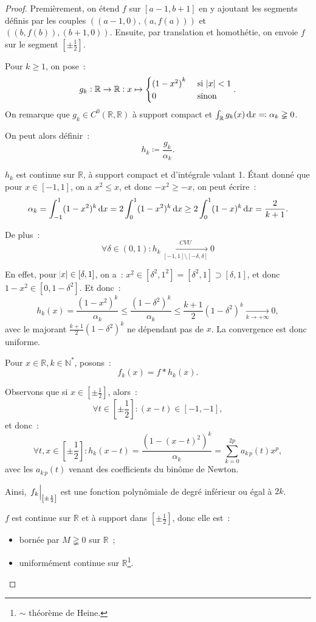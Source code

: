\documentclass{report}
\theoremstyle{definition}
\theoremstyle{remark}
\newcommand{\R}{\mathbb R}
\newcommand{\N}{\mathbb N}
\newcommand{\Ns}{\N^{*}}
\newcommand{\restr}[2]{\left.#1\vphantom{\big|}\right|_{#2}}
\newcommand{\pinfty}{{+\infty}}
\begin{document}
			\begin{proof} Premièrement, on étend $f$ sur $[a-1, b+1]$ en y ajoutant les segments définis par les couples $\left((a-1, 0), (a, f(a))\right)$ et
			$\left((b, f(b)), (b+1, 0)\right)$. Ensuite, par translation et homothétie, on envoie $f$ sur le segment $\left[\pm \frac 12\right]$.

			Pour $k \geq 1$, on pose~:
			\[g_k : \R \to \R : x \mapsto \begin{cases}{(1-x^2)}^k &\text{ si } \abs x < 1 \\0 &\text{ sinon}\end{cases}.\]
			On remarque que $g_k \in C^0(\R, \R)$ à support compact et $\int_\R g_k(x)\dif x \eqqcolon \alpha_k \gneqq 0$.

			On peut alors définir~:
			\[h_k \coloneqq \frac {g_k}{\alpha_k}.\]

			$h_k$ est continue sur $\R$, à support compact et d'intégrale valant 1. Étant donné que pour $x \in [-1, 1]$, on a $x^2 \leq x$, et donc $-x^2 \geq -x$,
			on peut écrire~:
			\[\alpha_k = \int_{-1}^1(1-x^2)^k\dif x = 2\int_0^1(1-x^2)^k\dif x \geq 2\int_0^1(1-x)^k\dif x = \frac 2{k+1}.\]

			De plus~:
			\[\forall \delta \in (0, 1) : h_k \xrightarrow[{[-1, 1] \setminus [-\delta, \delta]}]{CVU} 0\]

			En effet, pour $\abs x \in [\delta, 1]$, on a~: $x^2 \in [\delta^2, 1^2] = [\delta^2, 1] \supset [\delta, 1]$, et donc $1-x^2 \in [0, 1-\delta^2]$.
			Et donc~:
			\[h_k(x) = \frac {(1-x^2)^k}{\alpha_k} \leq \frac {(1-\delta^2)^k}{\alpha_k} \leq \frac {k+1}2(1-\delta^2)^k \xrightarrow[k \to \pinfty]{} 0,\]
			avec le majorant $\frac {k+1}2(1-\delta^2)^k$ ne dépendant pas de $x$. La convergence est donc uniforme.

			Pour $x \in \R, k \in \Ns$, posons~:
			\[f_k(x) = f * h_k(x).\]

			Observons que si $x \in \left[\pm \frac 12\right]$, alors~:
			\[\forall t \in \left[\pm \frac 12\right] : (x-t) \in [-1, -1],\]
			et donc~:
			\[\forall t, x \in \left[\pm \frac 12\right] : h_k(x-t) = \frac {{(1-(x-t)^2)}^k}{\alpha_k} = \sum_{k=0}^{2p}a_{k\,p}(t)x^p,\]
			avec les $a_{k\,p}(t)$ venant des coefficients du binôme de Newton.

			Ainsi, $\restr {f_k}{\left[\pm\frac 12\right]}$ est une fonction polynômiale de degré inférieur ou égal à $2k$.

			$f$ est continue sur $\R$ et à support dans $\left[\pm \frac 12\right]$, donc elle est~:
			\begin{itemize}
				\item bornée par $M \gneqq 0$ sur $\R$~;
				\item uniformément continue sur $\R$\footnote{$\sim$ théorème de Heine.}.
			\end{itemize}


\end{proof}
\end{document}
